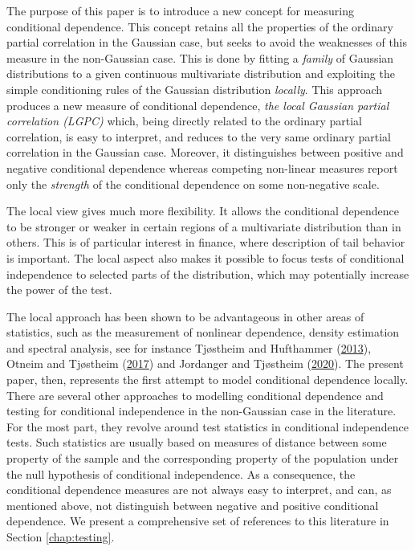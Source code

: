 \documentclass[
  12pt,
  letterpaper]{article}
\theoremstyle{definition}
\theoremstyle{definition}
\theoremstyle{definition}
\theoremstyle{remark}
\begin{document}
The purpose of this paper is to introduce a new concept for measuring conditional dependence. This concept retains all the properties of the ordinary partial correlation in the Gaussian case, but seeks to avoid the weaknesses of this measure in the non-Gaussian case. This is done by fitting a \emph{family} of Gaussian distributions to a given continuous multivariate distribution and exploiting the simple conditioning rules of the Gaussian distribution \emph{locally}. This approach produces a new measure of conditional dependence, \emph{the local Gaussian partial correlation (LGPC)} which, being directly related to the ordinary partial correlation, is easy to interpret, and reduces to the very same ordinary partial correlation in the Gaussian case. Moreover, it distinguishes between positive and negative conditional dependence whereas competing non-linear measures report only the \emph{strength} of the conditional dependence on some non-negative scale.

The local view gives much more flexibility. It allows the conditional dependence to be stronger or weaker in certain regions of a multivariate distribution than in others. This is of particular interest in finance, where description of tail behavior is important. The local aspect also makes it possible to focus tests of conditional independence to selected parts of the distribution, which may potentially increase the power of the test.

The local approach has been shown to be advantageous in other areas of statistics, such as the measurement of nonlinear dependence, density estimation and spectral analysis, see for instance Tjøstheim and Hufthammer (\protect\hyperlink{ref-tjostheim2013local}{2013}), Otneim and Tjøstheim (\protect\hyperlink{ref-otneim2017locally}{2017}) and Jordanger and Tjøstheim (\protect\hyperlink{ref-jordanger2017nonlinear}{2020}). The present paper, then, represents the first attempt to model conditional dependence locally. There are several other approaches to modelling conditional dependence and testing for conditional independence in the non-Gaussian case in the literature. For the most part, they revolve around test statistics in conditional independence tests. Such statistics are usually based on measures of distance between some property of the sample and the corresponding property of the population under the null hypothesis of conditional independence. As a consequence, the conditional dependence measures are not always easy to interpret, and can, as mentioned above, not distinguish between negative and positive conditional dependence. We present a comprehensive set of references to this literature in Section \ref{chap:testing}.
\end{document}
